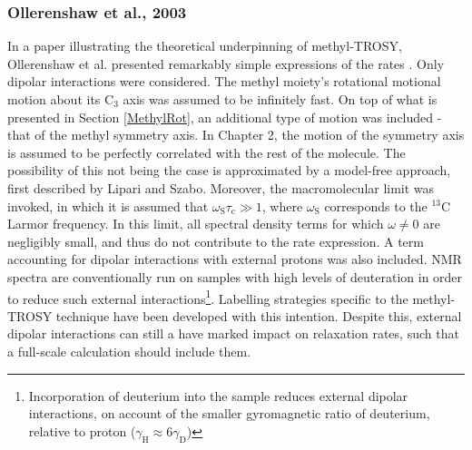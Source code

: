 \subsubsection{Ollerenshaw et al., 2003}
In a paper illustrating the theoretical underpinning of methyl-TROSY, Ollerenshaw et al. presented remarkably simple expressions of the rates \cite{RN17}. Only dipolar interactions were considered. The methyl moiety's rotational motional motion about its C$_3$ axis was assumed to be infinitely fast. On top of what is presented in Section \ref{MethylRot}, an additional type of motion was included - that of the methyl symmetry axis. In Chapter 2, the motion of the symmetry axis is assumed to be perfectly correlated with the rest of the molecule. The possibility of this not being the case is approximated by a model-free approach, first described by Lipari and Szabo\cite{RN31}. Moreover, the macromolecular limit was invoked, in which it is assumed that $\omega_{\text{S}} \tau_{\text{c}} \gg 1$, where $\omega_{\text{S}}$ corresponds to the $^{13}$C Larmor frequency. In this limit, all spectral density terms for which $\omega \neq 0$ are negligibly small, and thus do not contribute to the rate expression. A term accounting for dipolar interactions with external protons was also included. NMR spectra are conventionally run on samples with high levels of deuteration in order to reduce such external interactions\footnote{Incorporation of deuterium into the sample reduces external dipolar interactions, on account of the smaller gyromagnetic ratio of deuterium, relative to proton ($\gamma_{\text{H}} \approx 6 \gamma_{\text{D}}$)}. Labelling strategies specific to the methyl-TROSY technique have been developed with this intention\cite{RN45}. Despite this, external dipolar interactions can still a have marked impact on relaxation rates, such that a full-scale calculation should include them.
